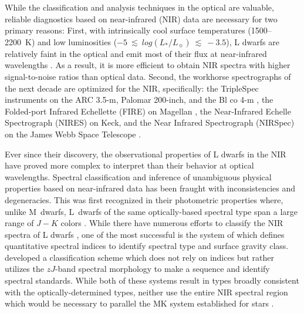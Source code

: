 \documentclass[12pt,preprint]{aastex}
\begin{document}
While the classification and analysis techniques in the optical are valuable, reliable diagnostics based on near-infrared (NIR) data are necessary for two primary reasons:
First, with intrinsically cool surface temperatures (1500--2200~K) and low luminosities ($-5~\lesssim~log(L_*/L_\sun)~\lesssim~-3.5$), L dwarfs are relatively faint in the optical and emit most of their flux at near-infrared wavelengths \citep[e.g.,][]{Filippazzo:2015vd}.
As a result, it is more efficient to obtain NIR spectra with higher signal-to-noise ratios than optical data.
Second, the workhorse spectrographs of the next decade are optimized for the NIR, specifically: the TripleSpec instruments on the ARC 3.5-m, Palomar 200-inch, and the Bl co 4-m \citep{Wilson:2004he}, the Folded-port Infrared Echellette (FIRE) on Magellan \citep{Simcoe:2013kh}, the Near-Infrared Echelle Spectrograph (NIRES) on Keck, and the Near Infrared Spectrograph (NIRSpec) on the James Webb Space Telescope \citep{Ferruit:2012em}.

Ever since their discovery, the observational properties of L dwarfs in the NIR have proved more complex to interpret than their behavior at optical wavelengths.
Spectral classification and inference of unambiguous physical properties based on near-infrared data has been fraught with inconsistencies and degeneracies.
This was first recognized in their photometric properties where, unlike M~dwarfs, L~dwarfs of the same optically-based spectral type span a large range of $J-K$ colors \citep[e.g.,][]{Leggett:2003tm}. 
While there have numerous efforts to classify the NIR spectra of L dwarfs \citep{Reid01_NIR, Testi01, Geballe02}, one of the most successful is the system of \citet{Allers:2013hk} which defines quantitative spectral indices to identify spectral type and surface gravity class.
\citet{Kirkpatrick10} developed a classification scheme which does not rely on indices but rather utilizes the $zJ$-band spectral morphology to make a sequence and identify spectral standards.
While both of these systems result in types broadly consistent with the optically-determined types, neither use the entire NIR spectral region which would be necessary to parallel the MK system established for stars \citep{Morgan:1984wy,Kirkpatrick05}.
\end{document}

